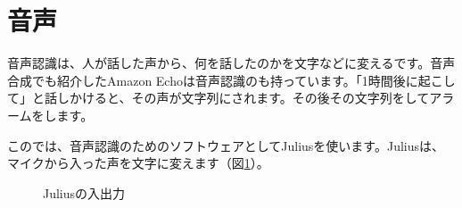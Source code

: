 \documentclass[text06.tex]{subfiles}
\begin{document}
\section{音声}
音声認識は、人が話した声から、何を話したのかを文字などに変えるです。音声合成でも紹介したAmazon Echoは音声認識のも持っています。「1時間後に起こして」と話しかけると、その声が文字列にされます。その後その文字列をしてアラームをします。

このでは、音声認識のためのソフトウェアとしてJuliusを使います。Juliusは、マイクから入った声を文字に変えます（図\ref{Juliusの入出力}）。

\begin{figure}[H]
\begin{center}
    
    \caption{Juliusの入出力}
    \label{Juliusの入出力}
\end{center}
\end{figure}

\begin{tcolorbox}[title=\useOmetoi]
\begin{enumerate}
\end{enumerate}
\end{tcolorbox}
\end{document}
